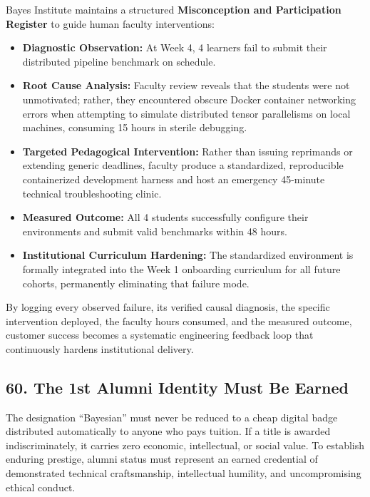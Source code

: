 Bayes Institute maintains a structured \textbf{Misconception and Participation Register} to guide human faculty interventions:
\begin{itemize}[leftmargin=*]
\item \textbf{Diagnostic Observation:} At Week 4, 4 learners fail to submit their distributed pipeline benchmark on schedule.
\item \textbf{Root Cause Analysis:} Faculty review reveals that the students were not unmotivated; rather, they encountered obscure Docker container networking errors when attempting to simulate distributed tensor parallelisms on local machines, consuming 15 hours in sterile debugging.
\item \textbf{Targeted Pedagogical Intervention:} Rather than issuing reprimands or extending generic deadlines, faculty produce a standardized, reproducible containerized development harness and host an emergency 45-minute technical troubleshooting clinic.
\item \textbf{Measured Outcome:} All 4 students successfully configure their environments and submit valid benchmarks within 48 hours.
\item \textbf{Institutional Curriculum Hardening:} The standardized environment is formally integrated into the Week 1 onboarding curriculum for all future cohorts, permanently eliminating that failure mode.
\end{itemize}

By logging every observed failure, its verified causal diagnosis, the specific intervention deployed, the faculty hours consumed, and the measured outcome, customer success becomes a systematic engineering feedback loop that continuously hardens institutional delivery.

\subsection*{60. The 1st Alumni Identity Must Be Earned}

The designation ``Bayesian'' must never be reduced to a cheap digital badge distributed automatically to anyone who pays tuition. If a title is awarded indiscriminately, it carries zero economic, intellectual, or social value. To establish enduring prestige, alumni status must represent an earned credential of demonstrated technical craftsmanship, intellectual humility, and uncompromising ethical conduct.

